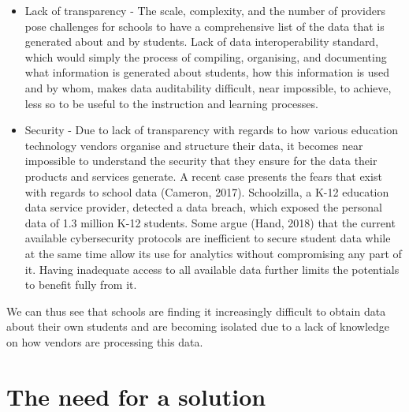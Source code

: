 \documentclass{article}
\begin{document}
\begin{itemize}
  \item Lack of transparency - The scale, complexity, and the number of providers pose challenges for schools to have a comprehensive list of the data that is generated about and by students. Lack of data interoperability standard, which would simply the process of compiling, organising, and documenting what information is generated about students, how this information is used and by whom, makes data auditability difficult, near impossible, to achieve, less so to be useful to the instruction and learning processes. 
  
  \item Security - Due to lack of transparency with regards to how various education technology vendors organise and structure their data, it becomes near impossible to understand the security that they ensure for the data their products and services generate. A recent case  presents the fears that exist with regards to school data (Cameron, 2017). Schoolzilla, a K-12 education data service provider, detected a data breach, which exposed the personal data of 1.3 million K-12 students. Some argue (Hand, 2018) that the current available cybersecurity protocols are inefficient to secure student data while at the same time allow its use for analytics without compromising any part of it. Having inadequate access to all available data further limits the potentials to benefit fully from it.
  
\end{itemize}

We can thus see that schools are finding it increasingly difficult to obtain data about their own students and are becoming isolated due to a lack of knowledge on how vendors are processing this data.

\section{The need for a solution}
\end{document}
